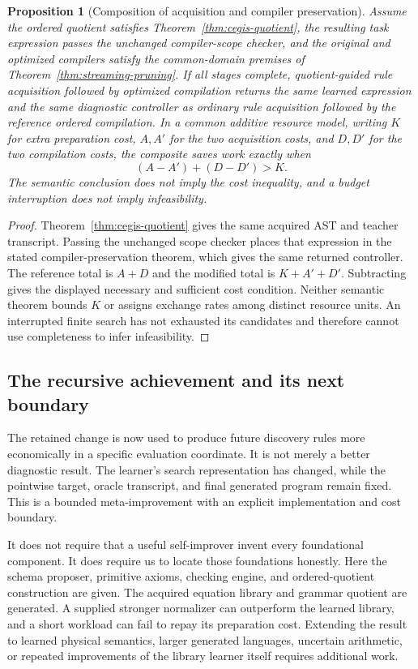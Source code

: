\documentclass[11pt,letterpaper]{article}
\theoremstyle{plain}
\newtheorem{proposition}[theorem]{Proposition}
\theoremstyle{definition}
\begin{document}
\begin{proposition}[Composition of acquisition and compiler preservation]\label{prop:meta-chain}
Assume the ordered quotient satisfies Theorem~\ref{thm:cegis-quotient}, the resulting task expression passes the unchanged compiler-scope checker, and the original and optimized compilers satisfy the common-domain premises of Theorem~\ref{thm:streaming-pruning}. If all stages complete, quotient-guided rule acquisition followed by optimized compilation returns the same learned expression and the same diagnostic controller as ordinary rule acquisition followed by the reference ordered compilation. In a common additive resource model, writing $K$ for extra preparation cost, $A,A'$ for the two acquisition costs, and $D,D'$ for the two compilation costs, the composite saves work exactly when
\[
 (A-A')+(D-D')>K.
\]
The semantic conclusion does not imply the cost inequality, and a budget interruption does not imply infeasibility.
\end{proposition}
\begin{proof}
Theorem~\ref{thm:cegis-quotient} gives the same acquired AST and teacher transcript. Passing the unchanged scope checker places that expression in the stated compiler-preservation theorem, which gives the same returned controller. The reference total is $A+D$ and the modified total is $K+A'+D'$. Subtracting gives the displayed necessary and sufficient cost condition. Neither semantic theorem bounds $K$ or assigns exchange rates among distinct resource units. An interrupted finite search has not exhausted its candidates and therefore cannot use completeness to infer infeasibility.
\end{proof}

\subsection{The recursive achievement and its next boundary}
The retained change is now used to produce future discovery rules more economically in a specific evaluation coordinate. It is not merely a better diagnostic result. The learner's search representation has changed, while the pointwise target, oracle transcript, and final generated program remain fixed. This is a bounded meta-improvement with an explicit implementation and cost boundary.

It does not require that a useful self-improver invent every foundational component. It does require us to locate those foundations honestly. Here the schema proposer, primitive axioms, checking engine, and ordered-quotient construction are given. The acquired equation library and grammar quotient are generated. A supplied stronger normalizer can outperform the learned library, and a short workload can fail to repay its preparation cost. Extending the result to learned physical semantics, larger generated languages, uncertain arithmetic, or repeated improvements of the library learner itself requires additional work.
\end{document}
